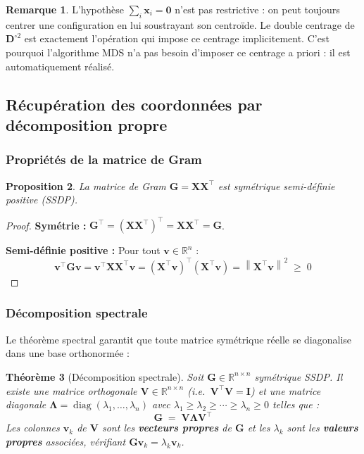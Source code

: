 \documentclass[12pt, a4paper]{article}
\theoremstyle{plain}
\newtheorem{theorem}{Théorème}[section]
\newtheorem{proposition}[theorem]{Proposition}
\theoremstyle{definition}
\newtheorem{remark}[theorem]{Remarque}
\newcommand{\R}{\mathbb{R}}
\newcommand{\norm}[1]{\left\lVert #1 \right\rVert}
\newcommand{\mat}[1]{\mathbf{#1}}
\newcommand{\vect}[1]{\mathbf{#1}}
\newcommand{\Gram}{\mat{G}}
\newcommand{\Dsq}{\mat{D}^{\circ 2}}
\begin{document}
\begin{remark}
    L'hypothèse $\sum_i \vect{x}_i = \vect{0}$ n'est pas restrictive : on
    peut toujours centrer une configuration en lui soustrayant son centroïde.
    Le double centrage de $\Dsq$ est exactement l'opération qui impose ce
    centrage implicitement. C'est pourquoi l'algorithme MDS n'a pas besoin
    d'imposer ce centrage a priori : il est automatiquement réalisé.
\end{remark}

\subsection{Récupération des coordonnées par décomposition propre}

\subsubsection{Propriétés de la matrice de Gram}

\begin{proposition}\label{prop:gram_psd}
    La matrice de Gram $\Gram = \mat{X}\mat{X}^\top$ est symétrique
    semi-définie positive (SSDP).
\end{proposition}

\begin{proof}
    \textbf{Symétrie :} $\Gram^\top = (\mat{X}\mat{X}^\top)^\top =
    \mat{X}\mat{X}^\top = \Gram$.

    \textbf{Semi-définie positive :} Pour tout $\vect{v} \in \R^n$ :
    \[
        \vect{v}^\top\Gram\vect{v}
        = \vect{v}^\top\mat{X}\mat{X}^\top\vect{v}
        = (\mat{X}^\top\vect{v})^\top(\mat{X}^\top\vect{v})
        = \norm{\mat{X}^\top\vect{v}}^2 \;\geq\; 0
    \]
\end{proof}

\subsubsection{Décomposition spectrale}

Le théorème spectral garantit que toute matrice symétrique réelle se
diagonalise dans une base orthonormée :

\begin{theorem}[Décomposition spectrale]\label{thm:spectral}
    Soit $\Gram \in \R^{n\times n}$ symétrique SSDP. Il existe une matrice
    orthogonale $\mat{V} \in \R^{n\times n}$ (i.e.\ $\mat{V}^\top\mat{V} =
    \mat{I}$) et une matrice diagonale $\mat{\Lambda} =
    \operatorname{diag}(\lambda_1, \ldots, \lambda_n)$ avec $\lambda_1 \geq
    \lambda_2 \geq \cdots \geq \lambda_n \geq 0$ telles que :
    \begin{equation}
        \Gram \;=\; \mat{V}\mat{\Lambda}\mat{V}^\top
    \end{equation}
    Les colonnes $\vect{v}_k$ de $\mat{V}$ sont les \textbf{vecteurs propres}
    de $\Gram$ et les $\lambda_k$ sont les \textbf{valeurs propres} associées,
    vérifiant $\Gram\vect{v}_k = \lambda_k\vect{v}_k$.
\end{theorem}
\end{document}

